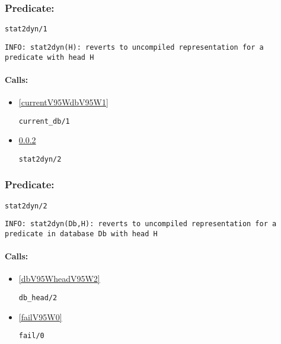 \subsubsection{Predicate:} \label{stat2dynV95W1}

\begin{verbatim}
stat2dyn/1
\end{verbatim}

{\small \begin{verbatim}
INFO: stat2dyn(H): reverts to uncompiled representation for a predicate with head H

\end{verbatim}}
\paragraph{Calls:} 
\begin{itemize}
\item \ref{currentV95WdbV95W1} 
\begin{verbatim}
current_db/1
\end{verbatim}

\item \ref{stat2dynV95W2} 
\begin{verbatim}
stat2dyn/2
\end{verbatim}

\end{itemize}

\subsubsection{Predicate:} \label{stat2dynV95W2}

\begin{verbatim}
stat2dyn/2
\end{verbatim}

{\small \begin{verbatim}
INFO: stat2dyn(Db,H): reverts to uncompiled representation for a predicate in database Db with head H

\end{verbatim}}
\paragraph{Calls:} 
\begin{itemize}
\item \ref{dbV95WheadV95W2} 
\begin{verbatim}
db_head/2
\end{verbatim}

\item \ref{failV95W0} 
\begin{verbatim}
fail/0
\end{verbatim}

\end{itemize}

